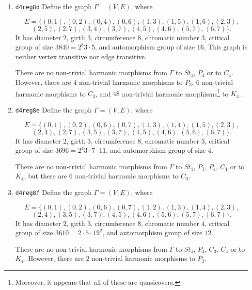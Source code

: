 \documentclass[12pt,letterpaper]{article}
\theoremstyle{definition}
\begin{document}
\begin{enumerate}
There are $36$ non-trivial harmonic morphisms from $\Gamma$ to $P_3$,
$72$ non-trivial harmonic morphisms\footnote{Moreover, it appears that
  all of these are multicovers.} from $\Gamma$ to $C_4$,
$576$ non-trivial harmonic
morphisms\footnote{Moreover, it appears that all of these
  are quasicovers.}
from $\Gamma$ to $K_4$, and
$48$ non-trivial harmonic morphisms from $\Gamma$ to $St_4$.
However, it has
no non-trivial harmonic morphisms from $\Gamma$ to $C_3$ or to $P_4$.

\item
{\tt d4reg8d}
\newline  
Define the graph $\Gamma = (V,E)$, where

\[
E = \{
(0, 1), (0, 2), (0, 4), (0, 6), (1, 3), (1, 5), (1, 6), (2, 3),
\]
\[
(2, 5), (2, 7), (3, 4), (3, 7), (4, 5), (4, 6), (5, 7), (6, 7)
\}.
\]
It has diameter $2$,
girth $3$, circumference $8$,
chromatic number $3$, 
critical group of size $3840 = 2^8 3 \cdot 5$, 
and automorphism group of size $16$.
This graph is neither vertex transitive nor edge transitive.

There are no non-trivial harmonic morphisms from $\Gamma$ to $St_4$,
$P_4$ or to $C_4$. However,
there are $4$ non-trivial harmonic morphisms to $P_3$,
$6$ non-trivial harmonic morphisms to $C_3$,
and $48$ non-trivial harmonic morphisms\footnote{Moreover,
  it appears that all of these are quasicovers.}
to $K_4$.

\item
{\tt d4reg8e}
\newline  
Define the graph $\Gamma = (V,E)$, where

\[
E = \{
(0, 1), (0, 2), (0, 6), (0, 7), (1, 3), (1, 4), (1, 5), (2, 3), 
\]
\[
(2, 4), (2, 7), (3, 5), (3, 7), (4, 5), (4, 6), (5, 6), (6, 7)
\}.
\]
It has diameter $2$,
girth $3$, circumference $8$,
chromatic number $3$, 
critical group of size $3696 = 2^4 3\cdot 7\cdot 11$, 
and automorphism group of size $4$.

There are no non-trivial harmonic morphisms from $\Gamma$ to $St_4$,
$P_3$, $P_4$, $C_4$ or to $K_4$, but there are $6$ non-trivial harmonic
morphisms to $C_3$.

\item
{\tt d4reg8f}
\newline  
Define the graph $\Gamma = (V,E)$, where

\[
E = \{
(0, 1), (0, 2), (0, 6), (0, 7), (1, 2), (1, 3), (1, 4), (2, 3),
\]
\[
(2, 4), (3, 5), (3, 7), (4, 5), (4, 6), (5, 6), (5, 7), (6, 7)
\}.
\]
It has diameter $2$,
girth $3$, circumference $8$,
chromatic number $4$, 
critical group of size $3610 = 2\cdot 5\cdot 19^2$, 
and automorphism group of size $12$.

There are no non-trivial harmonic morphisms from $\Gamma$ to $St_4$, $P_4$, $C_3$, $C_4$ or to $K_4$. However, there are $2$ non-trivial harmonic
morphisms to $P_3$.

\end{enumerate}
\end{document}
